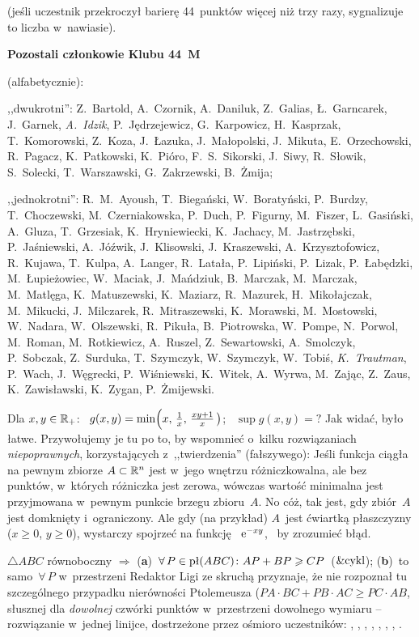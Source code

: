 {{(jeśli uczestnik przekroczył barierę 44~punktów więcej niż
trzy razy, sygnalizuje to liczba w~nawiasie).
\bigskip

{\centering
{\bf Pozostali członkowie Klubu 44~M}\kern7pt

(alfabetycznie):\kern7pt

}\smallskip

,,dwukrotni'': Z.~Bartold, A.~Czornik, A.~Daniluk,
Z.~Galias, Ł.~Garncarek, J.~Garnek, {\sl A.~Idzik}, P.~Jędrzejewicz,
G.~Karpowicz, H.~Kasprzak, T.~Komorowski, Z.~Koza, J.~Łazuka, J.~Małopolski,
J.~Mikuta, E.~Orzechowski, R.~Pagacz, K.~Patkowski, K.~Pióro, F.~S.~Sikorski,
J.~Siwy, R.~Słowik, S.~Solecki, T.~Warszawski, G.~Zakrzewski, B.~Żmija;
\smallskip

,,jednokrotni'': R.~M.~Ayoush, T.~Biegański,
W.~Boratyński, P.~Burdzy, T.~Choczewski, M.~Czerniakowska, P.~Duch, P.~Figurny,
M.~Fiszer, L.~Gasiński, A.~Gluza, T.~Grzesiak,
K.~Hryniewiecki, K.~Jachacy, M.~Jastrzębski, P.~Jaśniewski, A.~Jóźwik,
J.~Klisowski, J.~Kraszewski, A.~Krzysztofowicz, R.~Kujawa,
T.~Kulpa, A.~Langer, R.~Latała, P.~Lipiński, P.~Lizak,
P.~Łabędzki, M.~Łupieżowiec, W.~Maciak, J.~Mańdziuk,
B.~Marczak, M.~Marczak, M.~Matlęga, K.~Matuszewski, K.~Maziarz, R.~Mazurek, H.~Mikołajczak,
M.~Mikucki, J.~Milczarek, R.~Mitraszewski, K.~Morawski,
M.~Mostowski, W.~Nadara, W.~Olszewski, R.~Pikuła, B.~Piotrowska,
W.~Pompe, N.~Porwol, M.~Roman, M.~Rotkiewicz, A.~Ruszel, Z.~Sewartowski,
A.~Smolczyk, P.~Sobczak,
Z.~Surduka, T.~Szymczyk, W.~Szymczyk, W.~Tobiś, {\sl K.~Trautman}, P.~Wach, J.~Węgrecki, P.~Wiśniewski,
K.~Witek, A.~Wyrwa, M.~Zając, Z.~Zaus, K.~Zawisławski, K.~Zygan,
P.~Żmijewski.


}


{Dla ${x,y\in\R_+}$: \ ${g(x,y)=\min\Bigl(x,\,\frac1x,\,\frac{xy+1}x\,\bigr)}$; \ ${\sup{g(x,y)}=?}$}
Jak widać, było łatwe. Przywołujemy je tu po to, by wspomnieć o~kilku rozwiązaniach {\it niepoprawnych}, korzystających z~,,twierdzenia'' (fałszywego): Jeśli funkcja ciągła na pewnym zbiorze ${A\subset\R^n}$ jest w~jego wnętrzu różniczkowalna, ale bez punktów, w~których różniczka jest zerowa, wówczas wartość minimalna jest przyjmowana w~pewnym punkcie brzegu zbioru~$A$. No cóż, tak jest, gdy zbiór~$A$ jest domknięty i~ograniczony. Ale gdy (na przykład) $A$~jest ćwiartką płaszczyzny (${x\ge0}$, ${y\ge0}$), wystarczy spojrzeć na funkcję \ $\e^{-xy}$, \ by zrozumieć błąd.

{$\triangle{ABC}$ równoboczny $\Rightarrow$ ({\bf{a}})~$\forall\,P\in\hbox{pł}(ABC)\colon\,\newline AP+BP\ge{CP}$~(${\&\hbox{cykl}}$); ({\bf{b}})~to samo~$\forall\,P$ w~przestrzeni}
Redaktor Ligi ze skruchą przyznaje, że nie rozpoznał tu szczególnego przypadku nierówności Ptolemeusza (${PA\cdot{BC}+PB\cdot{AC}\ge{PC}\cdot{AB}}$, słusznej dla {\it dowolnej} czwórki punktów w~przestrzeni dowolnego wymiaru -- rozwiązanie w~jednej linijce, dostrzeżone przez ośmioro uczestników: \ada, \kna, \kub, \kum, \maz, \mro, \wie, \wis.

}
